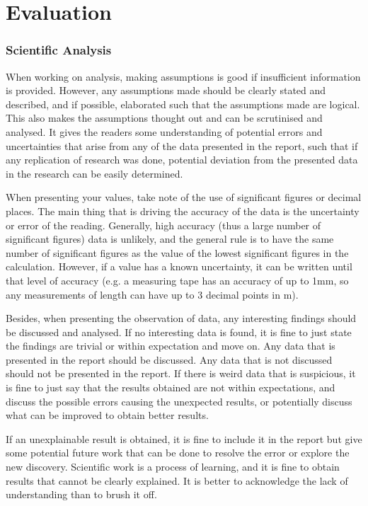 \chapter{Evaluation}
\subsection{Scientific Analysis}
When working on analysis, making assumptions is good if insufficient information is provided. However, any assumptions made should be clearly stated and described, and if possible, elaborated such that the assumptions made are logical. This also makes the assumptions thought out and can be scrutinised and analysed. It gives the readers some understanding of potential errors and uncertainties that arise from any of the data presented in the report, such that if any replication of research was done, potential deviation from the presented data in the research can be easily determined. 

When presenting your values, take note of the use of significant figures or decimal places. The main thing that is driving the accuracy of the data is the uncertainty or error of the reading. Generally, high accuracy (thus a large number of significant figures) data is unlikely, and the general rule is to have the same number of significant figures as the value of the lowest significant figures in the calculation. However, if a value has a known uncertainty, it can be written until that level of accuracy (e.g. a measuring tape has an accuracy of up to 1mm, so any measurements of length can have up to 3 decimal points in m). 

Besides, when presenting the observation of data, any interesting findings should be discussed and analysed. If no interesting data is found, it is fine to just state the findings are trivial or within expectation and move on. Any data that is presented in the report should be discussed. Any data that is not discussed should not be presented in the report. If there is weird data that is suspicious, it is fine to just say that the results obtained are not within expectations, and discuss the possible errors causing the unexpected results, or potentially discuss what can be improved to obtain better results. 

If an unexplainable result is obtained, it is fine to include it in the report but give some potential future work that can be done to resolve the error or explore the new discovery. Scientific work is a process of learning, and it is fine to obtain results that cannot be clearly explained. It is better to acknowledge the lack of understanding than to brush it off. 